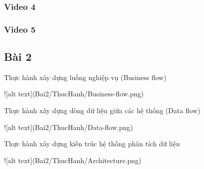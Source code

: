 \documentclass{article}
\begin{document}
\subsubsection{Video 4}

\subsubsection{Video 5}

\subsection{Bài 2}

\caption{Thực hành xây dựng luồng nghiệp vụ (Business flow)}
![alt text](Bai2/ThucHanh/Business-flow.png)
\caption{Thực hành xây dựng dòng dữ liệu giữa các hệ thống (Data flow)}
![alt text](Bai2/ThucHanh/Data-flow.png)
\caption{Thực hành xây dựng kiến trúc hệ thống phân tích dữ liệu}
![alt text](Bai2/ThucHanh/Architecture.png)

\end{document}
